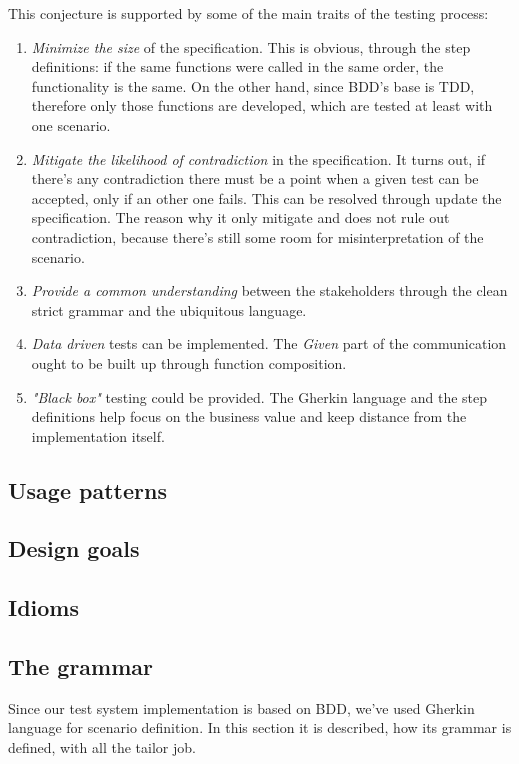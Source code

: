 \documentclass[conference]{IEEEtran}
\begin{document}
This conjecture is supported by some of the main traits of the testing process:
\begin{enumerate}
    \item \textit{Minimize the size} of the specification. This is obvious, through the step definitions: if the same functions were called in the same order, the functionality is the same. On the other hand, since BDD's base is TDD, therefore only those functions are developed, which are tested at least with one scenario.
    \item \textit{Mitigate the likelihood of contradiction} in the specification. It turns out, if there's any contradiction there must be a point when a given test can be accepted, only if an other one fails. This can be resolved through update the specification. The reason why it only mitigate and does not rule out contradiction, because there's still some room for misinterpretation of the scenario.
    \item \textit{Provide a common understanding} between the stakeholders through the clean strict grammar and the ubiquitous language.
    \item \textit{Data driven} tests can be implemented. The \textit{Given} part of the communication ought to be built up through function composition.
    \item \textit{"Black box"} testing could be provided. The Gherkin language and the step definitions help focus on the business value and keep distance from the implementation itself.
\end{enumerate}

\subsection{Usage patterns}
\subsection{Design goals}
\subsection{Idioms}

\subsection{The grammar}
Since our test system implementation is based on BDD, we've used Gherkin language for scenario definition. In this section it is described, how its grammar is defined, with all the tailor job.
\end{document}
